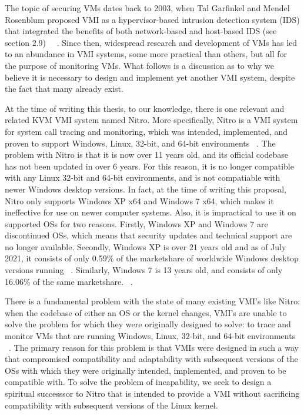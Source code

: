 \documentclass{report}
\begin{document}
\begin{spacing}{1.5}
{\large
The topic of securing VMs dates back to 2003, when Tal Garfinkel and Mendel Rosenblum proposed VMI as a hypervisor-based intrusion detection system (IDS) that integrated the benefits of both network-based and host-based IDS (see section 2.9) ~\cite{hebbal2015virtual}~\cite{somayaji2002operating}. Since then, widespread research and development of VMs has led to an abundance in VMI systems, some more practical than others, but all for the purpose of monitoring VMs. What follows is a discussion as to why we believe it is necessary to design and implement yet another VMI system, despite the fact that many already exist.
\newline
}



{\large
\noindent At the time of writing this thesis, to our knowledge, there is one relevant and related KVM VMI system named Nitro. More specifically, Nitro is a VMI system for system call tracing and monitoring, which was intended, implemented, and proven to support Windows, Linux, 32-bit, and 64-bit environments ~\cite{10.1007/978-3-642-25141-2_7}. The problem with Nitro is that it is now over 11 years old, and its official codebase has not been updated in over 6 years. For this reason, it is no longer compatible with any Linux 32-bit and 64-bit environments, and is not compatiable with newer Windows desktop versions. In fact, at the time of writing this proposal, Nitro only supports Windows XP x64 and Windows 7 x64, which makes it ineffective for use on newer computer systems. Also, it is impractical to use it on supported OSs for two reasons. Firstly, Windows XP and Windows 7 are discontinued OSs, which means that security updates and technical support are no longer available. Secondly, Windows XP is over 21 years old and as of July 2021, it consists of only 0.59\% of the marketshare of worldwide Windows desktop versions running ~\cite{luo2022teaching}. Similarly, Windows 7 is 13 years old, and consists of only 16.06\% of the same marketshare. ~\cite{luo2022teaching}.
\newline
}



{\large
\noindent There is a fundamental problem with the state of many existing VMI's like Nitro: when the codebase of either an OS or the kernel changes, VMI's are unable to solve the problem for which they were originally designed to solve: to trace and monitor VMs that are running Windows, Linux, 32-bit, and 64-bit environments ~\cite{win2014virtual}. The primary reason for this problem is that VMIs were designed in such a way that compromised compatibility and adaptability with subsequent versions of the OSs with which they were originally intended, implemented, and proven to be compatible with. To solve the problem of incapability, we seek to design a spiritual successsor to Nitro that is intended to provide a VMI without sacrificing compatibility with subsequent versions of the Linux kernel.
\newline
}










\end{spacing}
\end{document}
